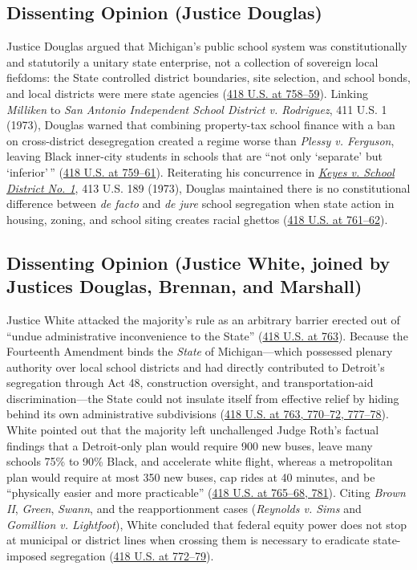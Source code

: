 \documentclass[12pt]{article}
\begin{document}
\subsection{Dissenting Opinion (Justice Douglas)}
Justice Douglas argued that Michigan's public school system was constitutionally and statutorily a unitary state enterprise, not a collection of sovereign local fiefdoms: the State controlled district boundaries, site selection, and school bonds, and local districts were mere state agencies (\href{https://supreme.justia.com/cases/federal/us/418/717/}{418 U.S. at 758--59}). Linking \textit{Milliken} to \textit{San Antonio Independent School District v. Rodriguez}, 411 U.S. 1 (1973), Douglas warned that combining property-tax school finance with a ban on cross-district desegregation created a regime worse than \textit{Plessy v. Ferguson}, leaving Black inner-city students in schools that are ``not only `separate' but `inferior'\,'' (\href{https://supreme.justia.com/cases/federal/us/418/717/}{418 U.S. at 759--61}). Reiterating his concurrence in \href{https://supreme.justia.com/cases/federal/us/413/189/}{\textit{Keyes v. School District No. 1}}, 413 U.S. 189 (1973), Douglas maintained there is no constitutional difference between \textit{de facto} and \textit{de jure} school segregation when state action in housing, zoning, and school siting creates racial ghettos (\href{https://supreme.justia.com/cases/federal/us/418/717/}{418 U.S. at 761--62}).

\subsection{Dissenting Opinion (Justice White, joined by Justices Douglas, Brennan, and Marshall)}
Justice White attacked the majority's rule as an arbitrary barrier erected out of ``undue administrative inconvenience to the State'' (\href{https://supreme.justia.com/cases/federal/us/418/717/}{418 U.S. at 763}). Because the Fourteenth Amendment binds the \textit{State} of Michigan---which possessed plenary authority over local school districts and had directly contributed to Detroit's segregation through Act 48, construction oversight, and transportation-aid discrimination---the State could not insulate itself from effective relief by hiding behind its own administrative subdivisions (\href{https://supreme.justia.com/cases/federal/us/418/717/}{418 U.S. at 763, 770--72, 777--78}). White pointed out that the majority left unchallenged Judge Roth's factual findings that a Detroit-only plan would require 900 new buses, leave many schools 75\% to 90\% Black, and accelerate white flight, whereas a metropolitan plan would require at most 350 new buses, cap rides at 40 minutes, and be ``physically easier and more practicable'' (\href{https://supreme.justia.com/cases/federal/us/418/717/}{418 U.S. at 765--68, 781}). Citing \textit{Brown II}, \textit{Green}, \textit{Swann}, and the reapportionment cases (\textit{Reynolds v. Sims} and \textit{Gomillion v. Lightfoot}), White concluded that federal equity power does not stop at municipal or district lines when crossing them is necessary to eradicate state-imposed segregation (\href{https://supreme.justia.com/cases/federal/us/418/717/}{418 U.S. at 772--79}).
\end{document}
